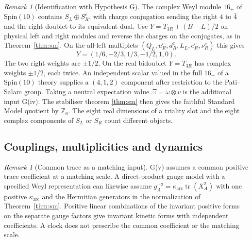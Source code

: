 \documentclass[aps,pra,onecolumn,superscriptaddress,nofootinbib,10pt]{revtex4-2}
\theoremstyle{definition}
\theoremstyle{remark}
\newtheorem{remark}[theorem]{Remark}
\begin{document}
\begin{remark}[Identification with Hypothesis G]
The complex Weyl module \(16_+\) of \(\mathrm{Spin}(10)\) contains
\(S_L\oplus S_R^c\), with charge conjugation sending the right
\(4\) to \(\bar4\) and the right doublet to its equivalent dual.
Use \(Y=T_{3R}+(B-L)/2\) on physical left and right modules and
reverse the charges on the conjugates, as in Theorem~\ref{thm:sm}.
On the all-left multiplets
\((Q_L,u_R^c,d_R^c,L_L,e_R^c,\nu_R^c)\) this gives
\[
 Y=(1/6,-2/3,1/3,-1/2,1,0).
\]
The two right weights are \(\pm1/2\). On the real bidoublet
\(Y=T_{3R}\) has complex weights \(\pm1/2\), each twice.
An independent scalar valued in the full \(16_-\) of a
\(\mathrm{Spin}(10)\) theory supplies a \((4,1,2)\) component
after restriction to the Pati--Salam group.
Taking a neutral expectation value \(\Xi=\omega\otimes v\)
is the additional input G(iv). The stabiliser theorem
\ref{thm:sm} then gives the faithful Standard Model quotient
by \(\mathbb Z_6\). The eight real dimensions of a triality
slot and the eight complex components of \(S_L\) or \(S_R\)
count different objects.
\end{remark}

\subsection{Couplings, multiplicities and dynamics}\label{tr:boundary}

\begin{remark}[Common trace as a matching input]\label{tr:traceinput}
G(v) assumes a common positive trace coefficient at a matching scale.
A direct-product gauge model with a specified Weyl representation can
likewise assume \(g_A^{-2}=\kappa_{\mathrm{arc}}\operatorname{tr}(X_A^2)\)
with one positive \(\kappa_{\mathrm{arc}}\) and the Hermitian generators in
the normalization of Theorem~\ref{thm:sm}. Positive linear combinations
of the invariant positive forms on the separate gauge factors give
invariant kinetic forms with independent coefficients. A clock does
not prescribe the common coefficient or the matching scale.
\end{remark}
\end{document}
